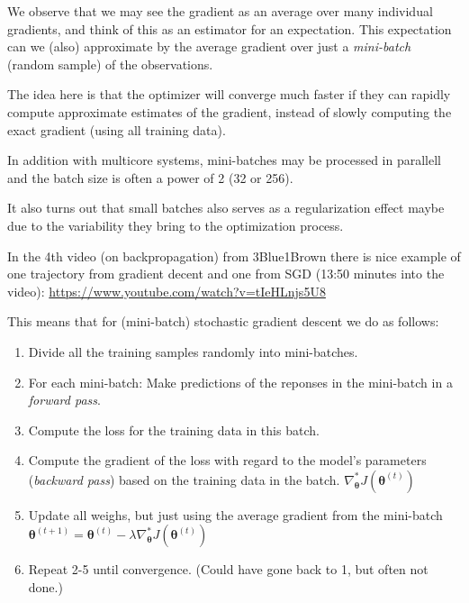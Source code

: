 \documentclass[10pt,ignorenonframetext,]{beamer}
\providecommand{\tightlist}{%
  \setlength{\itemsep}{0pt}\setlength{\parskip}{0pt}}
\begin{document}
\begin{frame}

We observe that we may see the gradient as an average over many
individual gradients, and think of this as an estimator for an
expectation. This expectation can we (also) approximate by the average
gradient over just a \emph{mini-batch} (random sample) of the
observations.

The idea here is that the optimizer will converge much faster if they
can rapidly compute approximate estimates of the gradient, instead of
slowly computing the exact gradient (using all training data).

In addition with multicore systems, mini-batches may be processed in
parallell and the batch size is often a power of 2 (32 or 256).

It also turns out that small batches also serves as a regularization
effect maybe due to the variability they bring to the optimization
process.

\end{frame}

\begin{frame}

In the 4th video (on backpropagation) from 3Blue1Brown there is nice
example of one trajectory from gradient decent and one from SGD (13:50
minutes into the video):
\url{https://www.youtube.com/watch?v=tIeHLnjs5U8}

\end{frame}

\begin{frame}

This means that for (mini-batch) stochastic gradient descent we do as
follows:

\begin{enumerate}
\tightlist
\item
  Divide all the training samples randomly into mini-batches.
\item
  For each mini-batch: Make predictions of the reponses in the
  mini-batch in a \emph{forward pass}.
\item
  Compute the loss for the training data in this batch.
\item
  Compute the gradient of the loss with regard to the model's parameters
  (\emph{backward pass}) based on the training data in the batch.
  \(\nabla_{\boldsymbol \theta}^* J({\boldsymbol \theta}^{(t)})\)
\item
  Update all weighs, but just using the average gradient from the
  mini-batch
  \({\boldsymbol \theta}^{(t+1)}={\boldsymbol \theta}^{(t)} - \lambda \nabla_{\boldsymbol \theta} ^* J({\boldsymbol \theta}^{(t)})\)
\item
  Repeat 2-5 until convergence. (Could have gone back to 1, but often
  not done.)
\end{enumerate}

\end{frame}
\end{document}
